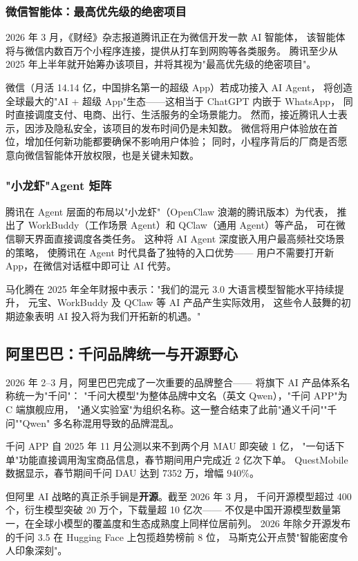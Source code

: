 \subsubsection{微信智能体：最高优先级的绝密项目}

2026 年 3 月，《财经》杂志报道腾讯正在为微信开发一款 AI 智能体，
该智能体将与微信内数百万个小程序连接，提供从打车到网购等各类服务。
腾讯至少从 2025 年上半年就开始筹办该项目，并将其视为"最高优先级的绝密项目"。

微信（月活 14.14 亿，中国排名第一的超级 App）若成功接入 AI Agent，
将创造全球最大的"AI + 超级 App"生态——这相当于 ChatGPT 内嵌于 WhatsApp，
同时直接调度支付、电商、出行、生活服务的全场景能力。
然而，接近腾讯人士表示，因涉及隐私安全，该项目的发布时间仍是未知数。
微信将用户体验放在首位，增加任何新功能都要确保不影响用户体验；
同时，小程序背后的厂商是否愿意向微信智能体开放权限，也是关键未知数。

\subsubsection{"小龙虾"Agent 矩阵}

腾讯在 Agent 层面的布局以"小龙虾"（OpenClaw 浪潮的腾讯版本）为代表，
推出了 WorkBuddy（工作场景 Agent）和 QClaw（通用 Agent）等产品，
可在微信聊天界面直接调度各类任务。
这种将 AI Agent 深度嵌入用户最高频社交场景的策略，
使腾讯在 Agent 时代具备了独特的入口优势——
用户不需要打开新 App，在微信对话框中即可让 AI 代劳。

马化腾在 2025 年全年财报中表示："我们的混元 3.0 大语言模型智能水平持续提升，
元宝、WorkBuddy 及 QClaw 等 AI 产品产生实际效用，
这些令人鼓舞的初期迹象表明 AI 投入将为我们开拓新的机遇。"

\subsection{阿里巴巴：千问品牌统一与开源野心}
\label{subsec:china-alibaba}

2026 年 2--3 月，阿里巴巴完成了一次重要的品牌整合——
将旗下 AI 产品体系名称统一为"千问"：
"千问大模型"为整体品牌中文名（英文 Qwen），"千问 APP"为 C 端旗舰应用，
"通义实验室"为组织名称。这一整合结束了此前"通义千问""千问""Qwen"
多名称混用导致的品牌混乱。

千问 APP 自 2025 年 11 月公测以来不到两个月 MAU 即突破 1 亿，
"一句话下单"功能直接调用淘宝商品信息，春节期间用户完成近 2 亿次下单。
QuestMobile 数据显示，春节期间千问 DAU 达到 7352 万，增幅 940\%。

但阿里 AI 战略的真正杀手锏是\textbf{开源}。截至 2026 年 3 月，
千问开源模型超过 400 个，衍生模型突破 20 万个，下载量超 10 亿次——
不仅是中国开源模型数量第一，在全球小模型的覆盖度和生态成熟度上同样位居前列。
2026 年除夕开源发布的千问 3.5 在 Hugging Face 上包揽趋势榜前 8 位，
马斯克公开点赞"智能密度令人印象深刻"。

